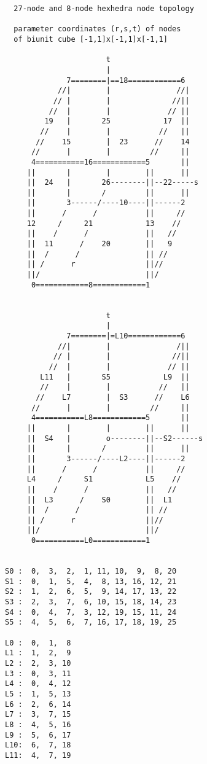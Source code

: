 \begin{verbatim}
  27-node and 8-node hexhedra node topology

  parameter coordinates (r,s,t) of nodes
  of biunit cube [-1,1]x[-1,1]x[-1,1]

                       t
                       |
              7========|==18============6
            //|        |               //|
           // |        |              //||
          //  |        |             // ||
         19   |       25            17  ||
        //    |        |           //   ||
       //    15        |  23      //    14
      //      |        |         //     ||
      4===========16============5       ||
     ||       |        |        ||      ||
     ||  24   |       26--------||--22-----s
     ||       |       /         ||      ||
     ||       3------/----10----||------2
     ||      /      /           ||     //
     12     /     21            13    //
     ||    /      /             ||   //
     ||  11      /    20        ||   9
     ||  /      /               || //
     || /      r                ||//
     ||/                        ||/
      0============8============1


                       t
                       |
              7========|=L10============6
            //|        |               /||
           // |        |              //||
          //  |        |             // ||
        L11   |       S5            L9  ||
        //    |        |           //   ||
       //    L7        |  S3      //    L6
      //      |        |         //     ||
      4===========L8============5       ||
     ||       |        |        ||      ||
     ||  S4   |        o--------||--S2------s
     ||       |       /         ||      ||
     ||       3------/----L2----||------2
     ||      /      /           ||     //
     L4     /     S1            L5    //
     ||    /      /             ||   //
     ||  L3      /    S0        ||  L1
     ||  /      /               || //
     || /      r                ||//
     ||/                        ||/
      0===========L0============1


S0 :  0,  3,  2,  1, 11, 10,  9,  8, 20
S1 :  0,  1,  5,  4,  8, 13, 16, 12, 21
S2 :  1,  2,  6,  5,  9, 14, 17, 13, 22
S3 :  2,  3,  7,  6, 10, 15, 18, 14, 23
S4 :  0,  4,  7,  3, 12, 19, 15, 11, 24
S5 :  4,  5,  6,  7, 16, 17, 18, 19, 25

L0 :  0,  1,  8
L1 :  1,  2,  9
L2 :  2,  3, 10
L3 :  0,  3, 11
L4 :  0,  4, 12
L5 :  1,  5, 13
L6 :  2,  6, 14
L7 :  3,  7, 15
L8 :  4,  5, 16
L9 :  5,  6, 17
L10:  6,  7, 18
L11:  4,  7, 19

\end{verbatim}


